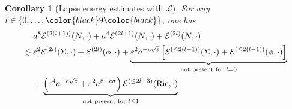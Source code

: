 \documentclass[11pt,leqno,textwidth=10cm]{amsart}
\numberwithin{equation}{section}
\theoremstyle{definition}
\theoremstyle{plain}
\newtheorem{corollary}[definition]{Corollary}
\newcommand{\1}{\mathbbm{1}}
\newcommand{\E}{\mathcal{E}}
\renewcommand{\L}{\mathcal{L}}
\newcommand{\Ric}{\text{\normalfont{Ric}}}
\renewcommand{\epsilon}{\varepsilon}
\newcommand{\change}[1]{\color{black}#1\color{black}}
\begin{document}
\begin{corollary}[Lapse energy estimates with $\L$]\label{cor:en-est-lapse}
For any $l\in\{0,\dots,\change{9}\}$, one has
\begin{align*}
&\,a^8\E^{(2(l+1))}(N,\cdot)+a^4\E^{(2l+1)}(N,\cdot)+\E^{(2l)}(N,\cdot)\\
\lesssim&\,\epsilon^2\E^{(2l)}(\Sigma,\cdot)+\E^{(2l)}(\phi,\cdot)+\underbrace{\epsilon^2a^{-c\sqrt{\epsilon}}\left[\E^{(\leq 2(l-1))}(\Sigma,\cdot)+\E^{(\leq 2(l-1))}(\phi,\cdot)\right]}_{\text{not present for }l=0}\\
&\,+\underbrace{\left(\epsilon^4a^{-c\sqrt{\epsilon}}+\epsilon^2a^{8-c\sigma}\right)\E^{(\leq 2l-3)}(\Ric,\cdot)}_{\text{not present for }l\leq 1}
\end{align*}
\end{corollary}
\end{document}
